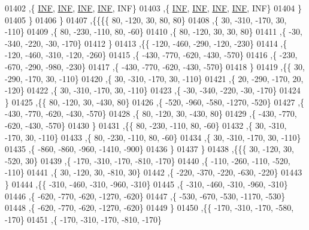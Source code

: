 \begin{DoxyCode}
01402     ,\{   \hyperlink{energy__const_8h_a12c2040f25d8e3a7b9e1c2024c618cb6}{INF},   \hyperlink{energy__const_8h_a12c2040f25d8e3a7b9e1c2024c618cb6}{INF},   \hyperlink{energy__const_8h_a12c2040f25d8e3a7b9e1c2024c618cb6}{INF},   \hyperlink{energy__const_8h_a12c2040f25d8e3a7b9e1c2024c618cb6}{INF},   INF\}
01403     ,\{   \hyperlink{energy__const_8h_a12c2040f25d8e3a7b9e1c2024c618cb6}{INF},   \hyperlink{energy__const_8h_a12c2040f25d8e3a7b9e1c2024c618cb6}{INF},   \hyperlink{energy__const_8h_a12c2040f25d8e3a7b9e1c2024c618cb6}{INF},   \hyperlink{energy__const_8h_a12c2040f25d8e3a7b9e1c2024c618cb6}{INF},   INF\}
01404     \}
01405    \}
01406   \}
01407  ,\{\{\{\{    80,  -120,    30,    80,    80\}
01408     ,\{    30,  -310,  -170,    30,  -110\}
01409     ,\{    80,  -230,  -110,    80,   -60\}
01410     ,\{    80,  -120,    30,    30,    80\}
01411     ,\{   -30,  -340,  -220,   -30,  -170\}
01412     \}
01413    ,\{\{  -120,  -460,  -290,  -120,  -230\}
01414     ,\{  -120,  -460,  -310,  -120,  -260\}
01415     ,\{  -430,  -770,  -620,  -430,  -570\}
01416     ,\{  -230,  -670,  -290,  -980,  -230\}
01417     ,\{  -430,  -770,  -620,  -430,  -570\}
01418     \}
01419    ,\{\{    30,  -290,  -170,    30,  -110\}
01420     ,\{    30,  -310,  -170,    30,  -110\}
01421     ,\{    20,  -290,  -170,    20,  -120\}
01422     ,\{    30,  -310,  -170,    30,  -110\}
01423     ,\{   -30,  -340,  -220,   -30,  -170\}
01424     \}
01425    ,\{\{    80,  -120,    30,  -430,    80\}
01426     ,\{  -520,  -960,  -580, -1270,  -520\}
01427     ,\{  -430,  -770,  -620,  -430,  -570\}
01428     ,\{    80,  -120,    30,  -430,    80\}
01429     ,\{  -430,  -770,  -620,  -430,  -570\}
01430     \}
01431    ,\{\{    80,  -230,  -110,    80,   -60\}
01432     ,\{    30,  -310,  -170,    30,  -110\}
01433     ,\{    80,  -230,  -110,    80,   -60\}
01434     ,\{    30,  -310,  -170,    30,  -110\}
01435     ,\{  -860,  -860,  -960, -1410,  -900\}
01436     \}
01437    \}
01438   ,\{\{\{    30,  -120,    30,  -520,    30\}
01439     ,\{  -170,  -310,  -170,  -810,  -170\}
01440     ,\{  -110,  -260,  -110,  -520,  -110\}
01441     ,\{    30,  -120,    30,  -810,    30\}
01442     ,\{  -220,  -370,  -220,  -630,  -220\}
01443     \}
01444    ,\{\{  -310,  -460,  -310,  -960,  -310\}
01445     ,\{  -310,  -460,  -310,  -960,  -310\}
01446     ,\{  -620,  -770,  -620, -1270,  -620\}
01447     ,\{  -530,  -670,  -530, -1170,  -530\}
01448     ,\{  -620,  -770,  -620, -1270,  -620\}
01449     \}
01450    ,\{\{  -170,  -310,  -170,  -580,  -170\}
01451     ,\{  -170,  -310,  -170,  -810,  -170\}

\end{DoxyCode}
